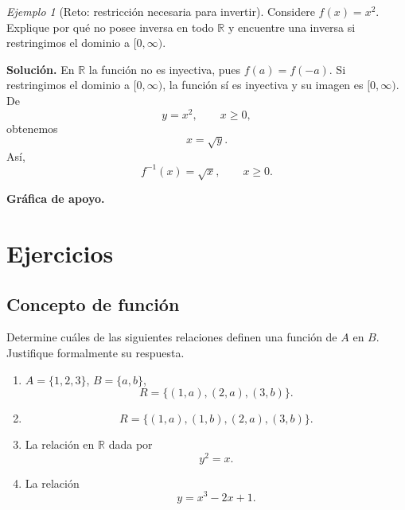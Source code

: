 \documentclass[12pt]{article}
\theoremstyle{remark}
\newtheorem{ejemplo}{Ejemplo}[section]
\newcommand{\R}{\mathbb{R}}
\begin{document}
\begin{ejemplo}[Reto: restricción necesaria para invertir]
Considere $f(x)=x^2$. Explique por qué no posee inversa en todo $\R$ y encuentre una inversa si restringimos el dominio a $[0,\infty)$.

\textbf{Solución.} En $\R$ la función no es inyectiva, pues $f(a)=f(-a)$. Si restringimos el dominio a $[0,\infty)$, la función sí es inyectiva y su imagen es $[0,\infty)$. De
\[
y=x^2,\qquad x\ge0,
\]
obtenemos
\[
x=\sqrt{y}.
\]
Así,
\[
\boxed{f^{-1}(x)=\sqrt{x},\qquad x\ge0}.
\]


\textbf{Gráfica de apoyo.}\medskip
\begin{center}
\end{center}

\end{ejemplo}

\newpage
\section{Ejercicios}
\subsection*{Concepto de función}

Determine cuáles de las siguientes relaciones definen una función de $A$ en
$B$. Justifique formalmente su respuesta.

\begin{enumerate}
    \item $A=\{1,2,3\}$, $B=\{a,b\}$,
    \[
    R=\{(1,a),(2,a),(3,b)\}.
    \]
    \item
    \[
    R=\{(1,a),(1,b),(2,a),(3,b)\}.
    \]
    \item La relación en $\R$ dada por
    \[
    y^2=x.
    \]
    \item La relación
    \[
    y=x^3-2x+1.
    \]
\end{enumerate}
\end{document}
